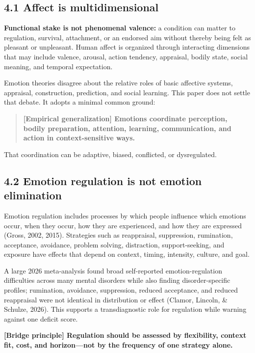 \documentclass[
  11pt,
]{article}
\begin{document}
\subsection{4.1 Affect is
multidimensional}\label{affect-is-multidimensional}

\textbf{Functional stake is not phenomenal valence:} a condition can
matter to regulation, survival, attachment, or an endorsed aim without
thereby being felt as pleasant or unpleasant. Human affect is organized
through interacting dimensions that may include valence, arousal, action
tendency, appraisal, bodily state, social meaning, and temporal
expectation.

Emotion theories disagree about the relative roles of basic affective
systems, appraisal, construction, prediction, and social learning. This
paper does not settle that debate. It adopts a minimal common ground:

\begin{quote}
\textbf{{[}Empirical generalization{]} Emotions coordinate perception,
bodily preparation, attention, learning, communication, and action in
context-sensitive ways.}
\end{quote}

That coordination can be adaptive, biased, conflicted, or dysregulated.

\subsection{4.2 Emotion regulation is not emotion
elimination}\label{emotion-regulation-is-not-emotion-elimination}

Emotion regulation includes processes by which people influence which
emotions occur, when they occur, how they are experienced, and how they
are expressed (Gross, 2002, 2015). Strategies such as reappraisal,
suppression, rumination, acceptance, avoidance, problem solving,
distraction, support-seeking, and exposure have effects that depend on
context, timing, intensity, culture, and goal.

A large 2026 meta-analysis found broad self-reported emotion-regulation
difficulties across many mental disorders while also finding
disorder-specific profiles; rumination, avoidance, suppression, reduced
acceptance, and reduced reappraisal were not identical in distribution
or effect (Clamor, Lincoln, \& Schulze, 2026). This supports a
transdiagnostic role for regulation while warning against one deficit
score.

\textbf{{[}Bridge principle{]} Regulation should be assessed by
flexibility, context fit, cost, and horizon---not by the frequency of
one strategy alone.}
\end{document}
